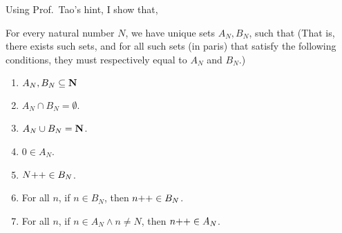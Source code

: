 Using Prof.~Tao's hint, I show that, 
\begin{lem}\label{my.lem.exer.3.5.12}
	For every natural number $N$, we have unique sets $A_N,B_N$, such that (That is, there exists such sets, and for all such sets (in paris) that satisfy the following conditions, they must respectively equal to $A_N$ and $B_N$.) 
	\begin{enumerate}
		\item $A_N, B_N \subseteq \mathbf{N}$
			\label{exer.3.5.12.2nd.cond.1}
		\item $A_N \cap B_N = \emptyset$. 
			\label{exer.3.5.12.2nd.cond.2}
		\item $A_N \cup B_N = \mathbf{N}$. 
			\label{exer.3.5.12.2nd.cond.3}
		\item $0 \in A_N$. 
			\label{exer.3.5.12.2nd.cond.4}
		\item $N{+}{+} \in B_N$. 
			\label{exer.3.5.12.2nd.cond.5}
		\item For all $n$, if $n \in B_N$, then $n{+}{+} \in B_N$. 
			\label{exer.3.5.12.2nd.cond.6}
		\item For all $n$, if $n \in A_N \wedge n \ne N$, then $n{+}{+} \in A_N$. 
			\label{exer.3.5.12.2nd.cond.7}
	\end{enumerate}
\end{lem}
